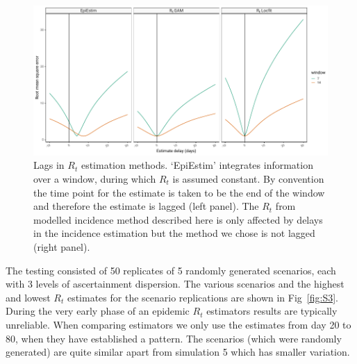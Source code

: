 \documentclass[a4paper, 12pt, twoside]{article}
\begin{document}
\begin{figure}[h!]
\centering
  \includegraphics{fig/fig2-lag-plot}
  \caption{Lags in $R_t$ estimation methods. `EpiEstim' integrates information over a window, during which $R_t$ is assumed constant. By convention the time point for the estimate is taken to be the end of the window and therefore the estimate is lagged (left panel). The $R_t$ from modelled incidence method described here is only affected by delays in the incidence estimation but the method we chose is not lagged (right panel).}
\label{fig:S2}
\end{figure}

\clearpage

The testing consisted of 50 replicates of 5 randomly generated scenarios, each with 3 levels of ascertainment dispersion. The various scenarios and the highest and lowest $R_t$ estimates for the scenario replications are shown in Fig~\ref{fig:S3}. During the very early phase of an epidemic $R_t$ estimators results are typically unreliable. When comparing estimators we only use the estimates from day 20 to 80, when they have established a pattern. The scenarios (which were randomly generated) are quite similar apart from simulation 5 which has smaller variation.
\end{document}
